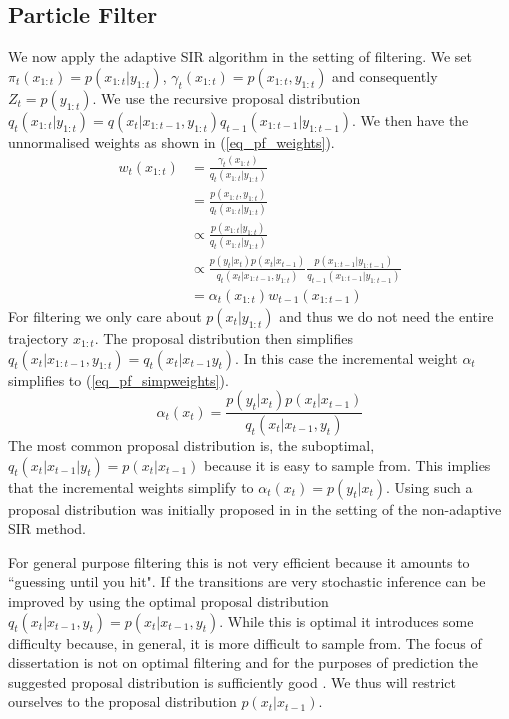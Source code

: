 \documentclass[../masters.tex]{subfiles}
\begin{document}
\subsection{Particle Filter}
We now apply the adaptive SIR algorithm in the setting of filtering. We set $\pi_t(x_{1:t}) = p(x_{1:t}|y_{1:t})$, $\gamma_t(x_{1:t}) = p(x_{1:t}, y_{1:t})$ and consequently $Z_t = p(y_{1:t})$. We use the recursive proposal distribution $q_t(x_{1:t}|y_{1:t}) = q(x_t|x_{1:t-1}, y_{1:t})q_{t-1}(x_{1:t-1}|y_{1:t-1})$. We then have the unnormalised weights as shown in (\ref{eq_pf_weights}).
\begin{equation}
\begin{aligned}
w_t(x_{1:t}) &= \frac{\gamma_t(x_{1:t})}{q_t(x_{1:t}|y_{1:t})} \\
&= \frac{p(x_{1:t}, y_{1:t})}{q_t(x_{1:t}|y_{1:t})} \\
&\propto \frac{p(x_{1:t}| y_{1:t})}{q_t(x_{1:t}|y_{1:t})} \\
&\propto \frac{p(y_t|x_t)p(x_t|x_{t-1})}{q_t(x_t|x_{1:t-1}, y_{1:t})}\frac{p(x_{1:t-1}| y_{1:t-1})}{q_{t-1}(x_{1:t-1}|y_{1:t-1})} \\
&= \alpha_t(x_{1:t})w_{t-1}(x_{1:t-1})
\end{aligned}
\label{eq_pf_weights}
\end{equation}
For filtering we only care about $p(x_t|y_{1:t})$ and thus we do not need the entire trajectory $x_{1:t}$. The proposal distribution then simplifies $q_t(x_t|x_{1:t-1}, y_{1:t}) = q_t(x_{t}|x_{t-1}y_{t})$. In this case the incremental weight $\alpha_t$ simplifies to (\ref{eq_pf_simpweights}).
\begin{equation}
\alpha_t(x_t) = \frac{p(y_t|x_t)p(x_t|x_{t-1})}{q_t(x_t|x_{t-1}, y_{t})} 
\label{eq_pf_simpweights}
\end{equation}
The most common proposal distribution is, the suboptimal, $q_t(x_t|x_{t-1}|y_t) = p(x_t|x_{t-1})$ because it is easy to sample from. This implies that the incremental weights simplify to $\alpha_t(x_t) = p(y_t|x_t)$. Using such a proposal distribution was initially proposed in \cite{gordon} in the setting of the non-adaptive SIR method. 

For general purpose filtering this is not very efficient because it amounts to ``guessing until you hit". If the transitions are very stochastic inference can be improved by using the optimal proposal distribution $q_t(x_t|x_{t-1}, y_t) = p(x_t|x_{t-1}, y_t)$. While this is optimal it introduces some difficulty because, in general, it is more difficult to sample from. The focus of dissertation is not on optimal filtering and for the purposes of prediction the suggested proposal distribution is sufficiently good \cite{murphy1}. We thus will restrict ourselves to the proposal distribution $p(x_t|x_{t-1})$.
\end{document}

